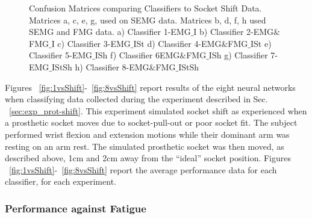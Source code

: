 \documentclass[twocolumn]{sagej}
\begin{document}
\begin{figure*}[htbp]
\centering
{}
\caption{Confusion Matrices comparing Classifiers to Socket Shift Data. Matrices a, c, e, g, used on SEMG data. Matrices b, d, f, h used SEMG and FMG data. a) Classifier 1-EMG$\_$I b) Classifier 2-EMG$\&$FMG$\_$I c) Classifier 3-EMG$\_$ISt d) Classifier 4-EMG$\&$FMG$\_$ISt e) Classifier 5-EMG$\_$ISh f) Classifier 6EMG$\&$FMG$\_$ISh g) Classifier 7-EMG$\_$IStSh h) Classifier 8-EMG$\&$FMG$\_$IStSh}

\end{figure*}

Figures ~\ref{fig:1vsShift}-~\ref{fig:8vsShift} report results of the eight neural networks when classifying data collected during the experiment described in Sec. ~\ref{sec:exp_prot-shift}.  This experiment simulated socket shift as experienced when a prosthetic socket moves due to socket-pull-out or poor socket fit.  The subject performed wrist flexion and extension motions while their dominant arm was resting on an arm rest.  The simulated prosthetic socket was then moved, as described above, 1cm and 2cm away from the ``ideal'' socket position.  Figures ~\ref{fig:1vsShift}-~\ref{fig:8vsShift} report the average performance data for each classifier, for each experiment.  \par \noindent

\subsubsection{Performance against Fatigue}
\label{sec:res_fatigue}

\begin{comment}
Data comparing different training data sets to fatigue

ideal, standing, shift -> fatigue
ideal, shift -> fatigue
ideal, standing -> fatigue
ideal -> fatigue
\end{comment}
\end{document}

